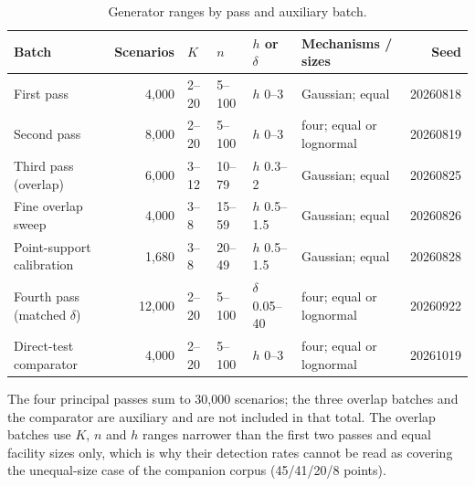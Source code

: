 \documentclass[journal=dce]{CUP-JNL-DTM}%
\begin{document}
\begin{appendix}
\begin{table}[htbp]
\centering
\small
\caption{Generator ranges by pass and auxiliary batch.}
\label{tab:design}
\begin{tabular}{p{3.0cm}rp{1.1cm}p{1.1cm}p{1.6cm}p{2.1cm}r}
\toprule
Batch & Scenarios & $K$ & $n$ & $h$ or $\delta$ & Mechanisms / sizes & Seed \\
\midrule
First pass & 4,000 & 2--20 & 5--100 & $h$ 0--3 & Gaussian; equal & 20260818 \\
Second pass & 8,000 & 2--20 & 5--100 & $h$ 0--3 & four; equal or lognormal & 20260819 \\
Third pass (overlap) & 6,000 & 3--12 & 10--79 & $h$ 0.3--2 & Gaussian; equal & 20260825 \\
Fine overlap sweep & 4,000 & 3--8 & 15--59 & $h$ 0.5--1.5 & Gaussian; equal & 20260826 \\
Point-support calibration & 1,680 & 3--8 & 20--49 & $h$ 0.5--1.5 & Gaussian; equal & 20260828 \\
Fourth pass (matched $\delta$) & 12,000 & 2--20 & 5--100 & $\delta$ 0.05--40 & four; equal or lognormal & 20260922 \\
Direct-test comparator & 4,000 & 2--20 & 5--100 & $h$ 0--3 & four; equal or lognormal & 20261019 \\
\bottomrule
\end{tabular}
\end{table}

The four principal passes sum to 30,000 scenarios; the three overlap batches and the comparator are auxiliary and are not included in that total. The overlap batches use $K$, $n$ and $h$ ranges narrower than the first two passes and equal facility sizes only, which is why their detection rates cannot be read as covering the unequal-size case of the companion corpus (45/41/20/8 points).

\end{appendix}
\end{document}
